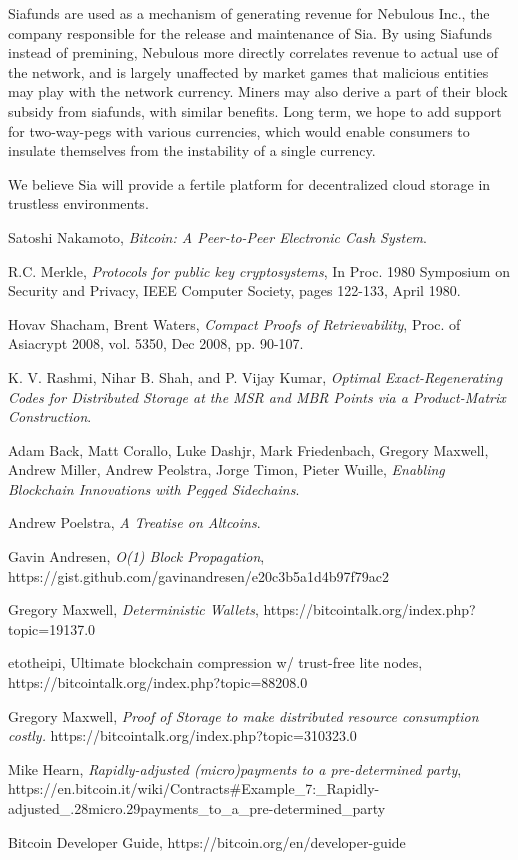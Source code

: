 \documentclass[twocolumn]{article}
\begin{document}
Siafunds are used as a mechanism of generating revenue for Nebulous Inc., the company responsible for the release and maintenance of Sia.
By using Siafunds instead of premining, Nebulous more directly correlates revenue to actual use of the network, and is largely unaffected by market games that malicious entities may play with the network currency.
Miners may also derive a part of their block subsidy from siafunds, with similar benefits.
Long term, we hope to add support for two-way-pegs with various currencies, which would enable consumers to insulate themselves from the instability of a single currency.

We believe Sia will provide a fertile platform for decentralized cloud storage in trustless environments.

\onecolumn
\begin{thebibliography}{9}

	Satoshi Nakamoto,
	\emph{Bitcoin: A Peer-to-Peer Electronic Cash System}.

	R.C. Merkle,
	\emph{Protocols for public key cryptosystems},
	In Proc. 1980 Symposium on Security and	Privacy,
	IEEE Computer Society, pages 122-133, April 1980.

	Hovav Shacham, Brent Waters,
	\emph{Compact Proofs of Retrievability},
	Proc. of Asiacrypt 2008, vol. 5350, Dec 2008, pp. 90-107.

	K. V. Rashmi, Nihar B. Shah, and P. Vijay Kumar,
	\emph{Optimal Exact-Regenerating Codes for Distributed Storage at the MSR and MBR Points via a Product-Matrix Construction}.

	Adam Back, Matt Corallo, Luke Dashjr, Mark Friedenbach, Gregory Maxwell, Andrew Miller, Andrew Peolstra, Jorge Timon, Pieter Wuille,
	\emph{Enabling Blockchain Innovations with Pegged Sidechains}.

	Andrew Poelstra,
	\emph{A Treatise on Altcoins}.

	Gavin Andresen,
	\emph{O(1) Block Propagation},
	https://gist.github.com/gavinandresen/e20c3b5a1d4b97f79ac2

	Gregory Maxwell,
	\emph{Deterministic Wallets},
	https://bitcointalk.org/index.php?topic=19137.0

	etotheipi,
	Ultimate blockchain compression w/ trust-free lite nodes, \newline
	https://bitcointalk.org/index.php?topic=88208.0

	Gregory Maxwell,
	\emph{Proof of Storage to make distributed resource consumption costly.} \newline
	https://bitcointalk.org/index.php?topic=310323.0

	Mike Hearn,
	\emph{Rapidly-adjusted (micro)payments to a pre-determined party},\newline
	https://en.bitcoin.it/wiki/Contracts\#Example\_7:\_Rapidly-adjusted\_.28micro.29payments\_to\_a\_pre-determined\_party

	Bitcoin Developer Guide,
	https://bitcoin.org/en/developer-guide


\end{thebibliography}
\end{document}
